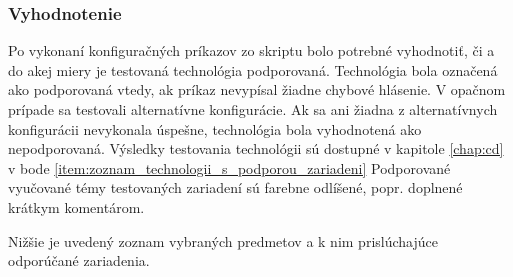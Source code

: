 \subsubsection{Vyhodnotenie}
\label{chap:testovanie_technologii_vyhodnotenie}

Po vykonaní konfiguračných príkazov zo skriptu bolo potrebné vyhodnotiť, či a do akej miery je testovaná technológia podporovaná. Technológia bola označená ako podporovaná vtedy, ak príkaz nevypísal žiadne chybové hlásenie. V opačnom prípade sa testovali alternatívne konfigurácie. Ak sa ani žiadna z alternatívnych konfigurácii nevykonala úspešne, technológia bola vyhodnotená ako nepodporovaná. Výsledky testovania technológii sú dostupné v kapitole \ref{chap:cd} v bode \ref{item:zoznam_technologii_s_podporou_zariadeni} Podporované vyučované témy testovaných zariadení sú farebne odlíšené, popr. doplnené krátkym komentárom.

Nižšie je uvedený zoznam vybraných predmetov a k nim prislúchajúce odporúčané zariadenia.


